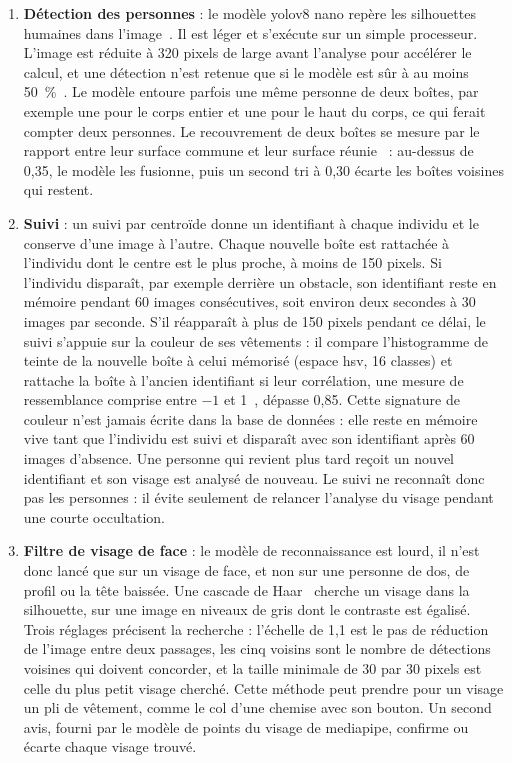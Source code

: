 \begin{maj}
\begin{enumerate}
  \item \textbf{Détection des personnes} : le modèle \gls{yolo}v8 nano repère les silhouettes humaines dans l'image~\cite{ultralytics_yolov8docs}. Il est léger et s'exécute sur un simple processeur. L'image est réduite à 320 pixels de large avant l'analyse pour accélérer le calcul, et une détection n'est retenue que si le modèle est sûr à au moins 50~\%~\cite{ultralytics_predict}. Le modèle entoure parfois une même personne de deux boîtes, par exemple une pour le corps entier et une pour le haut du corps, ce qui ferait compter deux personnes. Le recouvrement de deux boîtes se mesure par le rapport entre leur surface commune et leur surface réunie~\cite{everingham2010voc} : au-dessus de 0,35, le modèle les fusionne, puis un second tri à 0,30 écarte les boîtes voisines qui restent.
  \item \textbf{Suivi} : un suivi par centroïde donne un identifiant à chaque individu et le conserve d'une image à l'autre. Chaque nouvelle boîte est rattachée à l'individu dont le centre est le plus proche, à moins de 150 pixels. Si l'individu disparaît, par exemple derrière un obstacle, son identifiant reste en mémoire pendant 60 images consécutives, soit environ deux secondes à 30 images par seconde. S'il réapparaît à plus de 150 pixels pendant ce délai, le suivi s'appuie sur la couleur de ses vêtements : il compare l'histogramme de teinte de la nouvelle boîte à celui mémorisé (espace \gls{hsv}, 16 classes) et rattache la boîte à l'ancien identifiant si leur corrélation, une mesure de ressemblance comprise entre $-1$ et 1~\cite{opencv_histcompare}, dépasse 0,85. Cette signature de couleur n'est jamais écrite dans la base de données : elle reste en mémoire vive tant que l'individu est suivi et disparaît avec son identifiant après 60 images d'absence. Une personne qui revient plus tard reçoit un nouvel identifiant et son visage est analysé de nouveau. Le suivi ne reconnaît donc pas les personnes : il évite seulement de relancer l'analyse du visage pendant une courte occultation.
  \item \textbf{Filtre de visage de face} : le modèle de reconnaissance est lourd, il n'est donc lancé que sur un visage de face, et non sur une personne de dos, de profil ou la tête baissée. Une cascade de Haar~\cite{viola2001rapid,opencv_cascade} cherche un visage dans la silhouette, sur une image en niveaux de gris dont le contraste est égalisé. Trois réglages précisent la recherche : l'échelle de 1,1 est le pas de réduction de l'image entre deux passages, les cinq voisins sont le nombre de détections voisines qui doivent concorder, et la taille minimale de 30 par 30 pixels est celle du plus petit visage cherché. Cette méthode peut prendre pour un visage un pli de vêtement, comme le col d'une chemise avec son bouton. Un second avis, fourni par le modèle de points du visage de \gls{mediapipe}, confirme ou écarte chaque visage trouvé.

\end{enumerate}
\end{maj}
